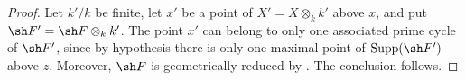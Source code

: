 \begin{proof}
Let $k'/k$ be finite, let $x'$ be a point of
$X'=X\otimes_k k'$ above $x$, and put
$\sh F'=\sh F\otimes_k k'$.
The point $x'$ can belong to only one associated prime cycle of
$\sh F'$, since by hypothesis there is only one maximal point of
$\operatorname{Supp}(\sh F')$ above $z$.
Moreover, $\sh F$ is geometrically reduced by
.
The conclusion follows.
\end{proof}
